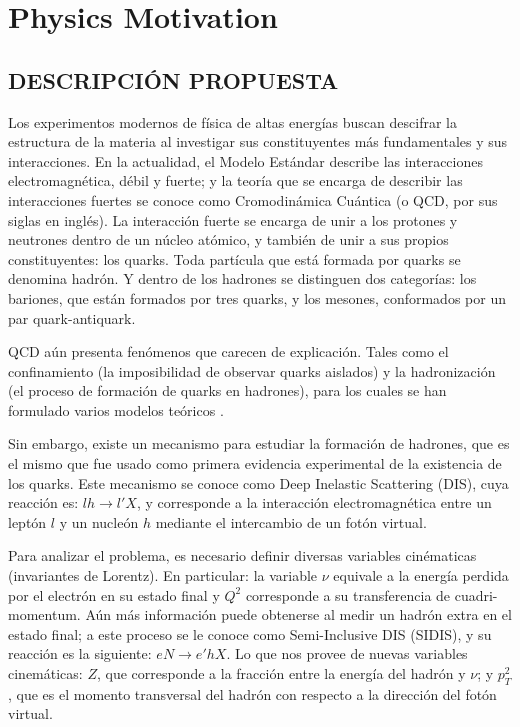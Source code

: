 \chapter{Physics Motivation}

\section{DESCRIPCIÓN PROPUESTA}

Los experimentos modernos de física de altas energías buscan descifrar la estructura de la materia al investigar sus constituyentes más fundamentales y sus interacciones. En la actualidad, el Modelo Estándar describe las interacciones electromagnética, débil y fuerte; y la teoría que se encarga de describir las interacciones fuertes se conoce como Cromodinámica Cuántica (o QCD, por sus siglas en inglés). La interacción fuerte se encarga de unir a los protones y neutrones dentro de un núcleo atómico, y también de unir a sus propios constituyentes: los quarks. Toda partícula que está formada por quarks se denomina hadrón. Y dentro de los hadrones se distinguen dos categorías: los bariones, que están formados por tres quarks, y los mesones, conformados por un par quark-antiquark.

QCD aún presenta fenómenos que carecen de explicación. Tales como el confinamiento (la imposibilidad de observar quarks aislados) y la hadronización (el proceso de formación de quarks en hadrones), para los cuales se han formulado varios modelos teóricos \cite{mt1, mt2, mt3}.

Sin embargo, existe un mecanismo para estudiar la formación de hadrones, que es el mismo que fue usado como primera evidencia experimental de la existencia de los quarks. Este mecanismo se conoce como Deep Inelastic Scattering (DIS), cuya reacción es: $l h \rightarrow l' X$, y corresponde a la interacción electromagnética entre un leptón $l$ y un nucleón $h$ mediante el intercambio de un fotón virtual.


Para analizar el problema, es necesario definir diversas variables cinématicas (invariantes de Lorentz). En particular: la variable $\nu$ equivale a la energía perdida por el electrón en su estado final y $Q^2$ corresponde a su transferencia de cuadri-momentum. Aún más información puede obtenerse al medir un hadrón extra en el estado final; a este proceso se le conoce como Semi-Inclusive DIS (SIDIS), y su reacción es la siguiente: $e N \rightarrow e' h X$. Lo que nos provee de nuevas variables cinemáticas: $Z$, que corresponde a la fracción entre la energía del hadrón y $\nu$; y $p_T^2$, que es el momento transversal del hadrón con respecto a la dirección del fotón virtual.

